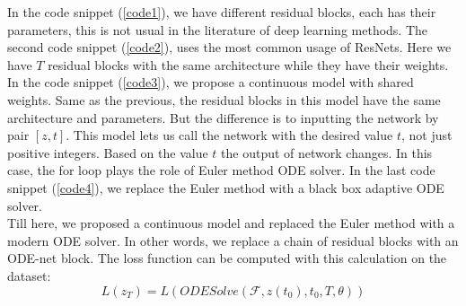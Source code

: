 \documentclass{article}
\newcommand\pef[1]{(\ref{#1})}
\begin{document}
	In the code snippet \pef{code1}, we have different residual blocks, each has their parameters, this is not usual in the literature of deep learning methods. The second code snippet \pef{code2}, uses the most common usage of ResNets. Here we have $T$ residual blocks with the same architecture while they have their weights. In the code snippet \pef{code3}, we propose a continuous model with shared weights. Same as the previous, the residual blocks in this model have the same architecture and parameters. But the difference is to inputting the network by pair $[z,t]$. This model lets us call the network with the desired value $t$, not just positive integers. Based on the value $t$ the output of network changes. In this case, the for loop plays the role of Euler method ODE solver. In the last code snippet \pef{code4}, we replace the Euler method with a black box adaptive ODE solver.
	\\ 
	
	Till here, we proposed a continuous model and replaced the Euler method with a modern ODE solver. In other words, we replace a chain of residual blocks with an ODE-net block. The loss function can be computed with this calculation on the dataset:
	\begin{equation*}
	L(z_{T}) = L(ODESolve(\mathcal{F},z(t_0),t_0,T,\theta))
	\end{equation*}
\end{document}
